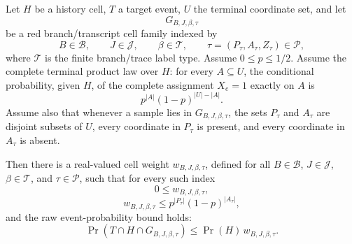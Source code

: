 \begin{helper}
Let \(H\) be a history cell, \(T\) a target event, \(U\) the terminal
coordinate set, and let
\[
G_{B,J,\beta,\tau}
\]
be a red branch/transcript cell family indexed by
\[
B\in\mathcal B,\qquad J\in\mathcal J,\qquad
\beta\in\mathcal T,\qquad \tau=(P_\tau,A_\tau,Z_\tau)\in\mathcal P,
\]
where \(\mathcal T\) is the finite branch/trace label type.
Assume \(0\le p\le 1/2\).  Assume the complete terminal product law over
\(H\): for every \(A\subseteq U\), the conditional probability, given \(H\),
of the complete assignment \(X_e=1\) exactly on \(A\) is
\[
p^{|A|}(1-p)^{|U|-|A|}.
\]
Assume also that whenever a sample lies in \(G_{B,J,\beta,\tau}\), the sets
\(P_\tau\) and \(A_\tau\) are disjoint subsets of \(U\), every coordinate in
\(P_\tau\) is present, and every coordinate in \(A_\tau\) is absent.

Then there is a real-valued cell weight \(w_{B,J,\beta,\tau}\), defined for
all \(B\in\mathcal B\), \(J\in\mathcal J\),
\(\beta\in\mathcal T\), and \(\tau\in\mathcal P\), such that for every
such index
\[
0\le w_{B,J,\beta,\tau},
\]
\[
w_{B,J,\beta,\tau}\le p^{|P_\tau|}(1-p)^{|A_\tau|},
\]
and the raw event-probability bound holds:
\[
\Pr(T\cap H\cap G_{B,J,\beta,\tau})
\le
\Pr(H)\,w_{B,J,\beta,\tau}.
\]
\end{helper}

